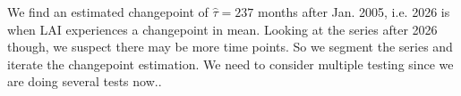 \documentclass[12pt]{article}
\newcommand{\ed}{\end{document}}
\begin{document}
We find an estimated changepoint of $\hat{\tau}= 237$ months after Jan. 2005, i.e. 2026 is when LAI experiences a changepoint in mean. Looking at the series after 2026 though, we suspect there may be more time points. So we segment the series and iterate the changepoint estimation. We need to consider multiple testing since we are doing several tests now..



\ed
\end{document}

